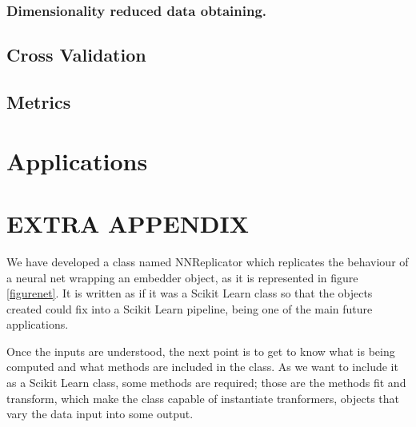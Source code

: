 \documentclass[a4paper,11pt,spanish]{report}
\begin{document}

\subsection{Dimensionality reduced data obtaining.}
\label{ssec:trans}



\section{Cross Validation}
\label{sec:cv}

\section{Metrics}
\label{sec:met}



\chapter{Applications}
\label{chap:app}


\chapter{EXTRA APPENDIX}
\label{chap:append}

We have developed a class named NNReplicator which replicates the behaviour of a neural net wrapping an embedder object, as it is represented in figure \ref{figurenet}. It is written as if it was a Scikit Learn class so that the objects created could fix into a Scikit Learn pipeline, being one of the main future applications.

Once the inputs are understood, the next point is to get to know what is being computed and what methods are included in the class. As we want to include it as a Scikit Learn class, some methods are required; those are the methods fit and transform, which make the class capable of instantiate tranformers, objects that vary the data input into some output.
\end{document}
